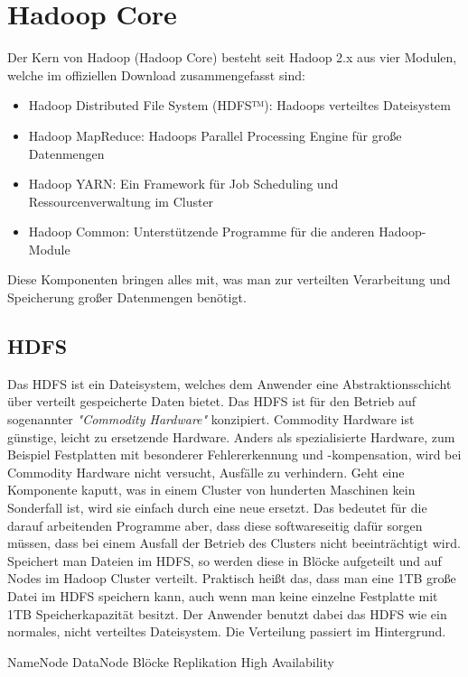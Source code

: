 \section{Hadoop Core}
Der Kern von Hadoop (Hadoop Core) besteht seit Hadoop 2.x aus vier Modulen, welche im offiziellen Download zusammengefasst sind\cite{noauthor_apache_nodate}:
\begin{itemize}
    \item Hadoop Distributed File System (HDFS™): Hadoops verteiltes Dateisystem
    \item Hadoop MapReduce: Hadoops Parallel Processing Engine für große Datenmengen
    \item Hadoop YARN: Ein Framework für Job Scheduling und Ressourcenverwaltung im Cluster
    \item Hadoop Common: Unterstützende Programme für die anderen Hadoop-Module
\end{itemize}
Diese Komponenten bringen alles mit, was man zur verteilten Verarbeitung und Speicherung großer Datenmengen benötigt. 

\subsection{HDFS}
\label{chap:fund sec:core sub:hdfs}
Das HDFS ist ein Dateisystem, welches dem Anwender eine Abstraktionsschicht über verteilt gespeicherte Daten bietet. Das HDFS ist für den Betrieb auf sogenannter \textit{"Commodity Hardware"} konzipiert. Commodity Hardware ist günstige, leicht zu ersetzende Hardware. Anders als spezialisierte Hardware, zum Beispiel Festplatten mit besonderer Fehlererkennung und -kompensation, wird bei Commodity Hardware nicht versucht, Ausfälle zu verhindern. Geht eine Komponente kaputt, was in einem Cluster von hunderten Maschinen kein Sonderfall ist, wird sie einfach durch eine neue ersetzt. Das bedeutet für die darauf arbeitenden Programme aber, dass diese softwareseitig dafür sorgen müssen, dass bei einem Ausfall der Betrieb des Clusters nicht beeinträchtigt wird.\cite{white_hadoop_2015} 
Speichert man Dateien im HDFS, so werden diese in Blöcke aufgeteilt und auf Nodes im Hadoop Cluster verteilt. Praktisch heißt das, dass man eine 1TB große Datei im HDFS speichern kann, auch wenn man keine einzelne Festplatte mit 1TB Speicherkapazität besitzt. Der Anwender benutzt dabei das HDFS wie ein normales, nicht verteiltes Dateisystem. Die Verteilung passiert im Hintergrund. 

NameNode
DataNode
Blöcke
Replikation
High Availability

